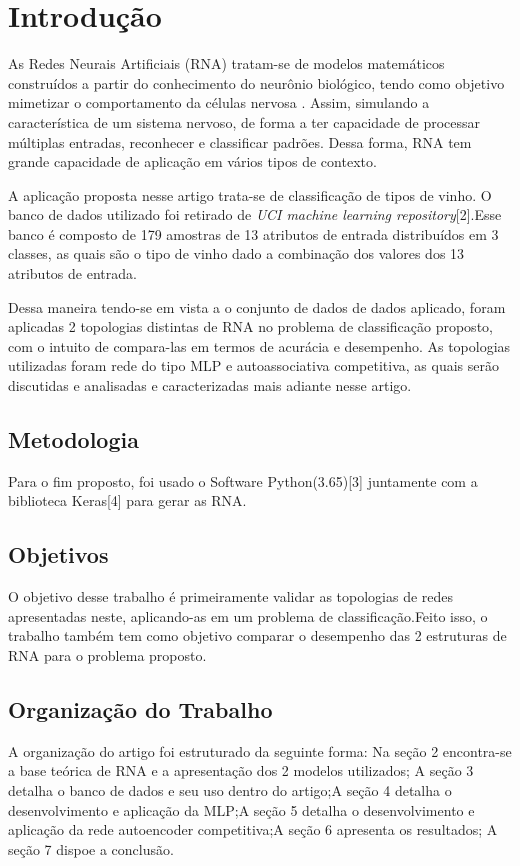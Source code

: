 
\section{Introdução}
As Redes Neurais Artificiais (RNA) tratam-se de modelos matemáticos construídos a partir do conhecimento do neurônio biológico, tendo como objetivo mimetizar o comportamento da células nervosa \cite{ref1} . Assim, simulando a característica de um sistema nervoso, de forma a ter capacidade de processar múltiplas entradas, reconhecer e classificar padrões. Dessa forma, RNA tem grande capacidade de aplicação em vários tipos de contexto.

A aplicação proposta nesse artigo trata-se de classificação de tipos de vinho. O banco de dados utilizado foi retirado de \textit{UCI machine learning repository}[2].Esse banco é composto de 179 amostras de 13 atributos de entrada distribuídos em 3 classes, as quais são o tipo de vinho dado a combinação dos valores dos 13  atributos de entrada.

Dessa maneira tendo-se em vista a o conjunto de dados de dados aplicado, foram aplicadas 2 topologias distintas de RNA no problema de classificação proposto, com o intuito de compara-las em termos de acurácia e desempenho. As topologias utilizadas foram rede do tipo MLP e autoassociativa competitiva, as quais serão discutidas e analisadas e caracterizadas mais adiante nesse artigo.


\subsection{Metodologia}

Para o fim proposto, foi usado o Software Python(3.65)[3] juntamente com a biblioteca Keras[4] para gerar as RNA.


\subsection{Objetivos}

O objetivo desse trabalho é primeiramente validar as topologias de redes apresentadas neste, aplicando-as em um problema de classificação.Feito isso, o trabalho também tem como objetivo comparar o desempenho das 2 estruturas de RNA para  o problema proposto.


\subsection{Organização do Trabalho}

A organização do artigo foi estruturado da seguinte forma: Na seção 2 encontra-se a base teórica de RNA e a apresentação dos 2 modelos utilizados; A seção 3 detalha o banco de dados e seu uso dentro do artigo;A seção 4 detalha o desenvolvimento e aplicação da MLP;A seção 5 detalha o desenvolvimento e aplicação da rede autoencoder competitiva;A seção 6 apresenta os resultados; A seção 7 dispoe a conclusão. 